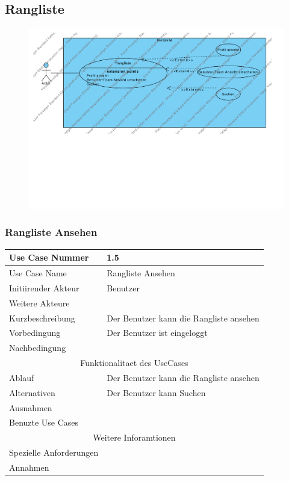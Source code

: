 \documentclass[10pt,a4paper]{article}
\begin{document}
\subsection{Rangliste}
	\begin{figure}[h]
		\includegraphics[width=\linewidth]{gfx/webseite/rangliste.pdf}
	\end{figure}
	\subsubsection{Rangliste Ansehen}
		\begin{tabular}{|l|p{.5\linewidth}|}
		\hline Use Case Nummer & 1.5 \\ 
		\hline Use Case Name & Rangliste Ansehen \\ 
		\hline Initiirender Akteur & Benutzer \\
		\hline Weitere Akteure &  \\
		\hline Kurzbeschreibung & Der Benutzer kann die Rangliste ansehen \\
		\hline Vorbedingung & Der Benutzer ist eingeloggt \\
		\hline Nachbedingung &  \\
		\hline \multicolumn{2}{|c|}{Funktionalitaet des UseCases}\\
		\hline Ablauf & Der Benutzer kann die Rangliste ansehen \\
		\hline Alternativen & Der Benutzer kann Suchen \\
		\hline Ausnahmen &  \\
		\hline Benuzte Use Cases &  \\
		\hline \multicolumn{2}{|c|}{Weitere Inforamtionen} \\
		\hline Spezielle Anforderungen &  \\
		\hline Annahmen &  \\
		\hline
		\end{tabular}
\end{document}
